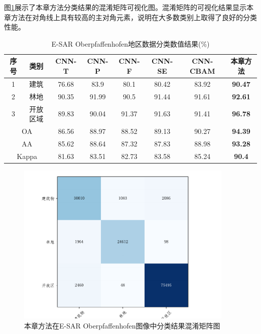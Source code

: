 图\ref{fig:ober_conf_matrix}展示了本章方法分类结果的混淆矩阵可视化图。混淆矩阵的可视化结果显示本章方法在对角线上具有较高的主对角元素，说明在大多数类别上取得了良好的分类性能。

\begin{table}[ht!]
    \caption{E-SAR Oberpfaffenhofen地区数据分类数值结果(\%)}
    \label{tab:ober_res}
    \begin{tabular}{cccccccc}
        \toprule[1.5bp]
        序号                        & 类别    & CNN-T & CNN-P & CNN-F & CNN-SE & CNN-CBAM       & 本章方法           \\
        \midrule[0.75bp]
        1                         & 建筑    & 76.68 & 83.9  & 80.1  & 80.42  & 83.92          & \textbf{90.47} \\
        2                         & 林地    & 90.35 & 91.99 & 90.5  & 91.44  & 91.61          & \textbf{92.61} \\
        3                         & 开放区域  & 89.83 & 90.04 & 91.37 & 91.63  & 91.41          & \textbf{96.78} \\
        \midrule[0.75bp]
        \multicolumn{2}{c}{OA}    & 86.56 & 88.97 & 88.52 & 89.13 & 90.27  & \textbf{94.39}                  \\
        \multicolumn{2}{c}{AA}    & 85.62 & 88.64 & 87.32 & 87.83 & 88.98  & \textbf{93.28}                  \\
        \multicolumn{2}{c}{Kappa} & 81.63 & 83.51 & 82.73 & 83.58 & 85.24  & \textbf{90.4}                   \\
        \bottomrule[1.5bp]
    \end{tabular}
\end{table}

\begin{figure}[ht!]
    \centering
    \includegraphics[width=10.4cm]{pic/chapter3/ober/conf-matrix.pdf}
    \caption{本章方法在E-SAR Oberpfaffenhofen图像中分类结果混淆矩阵图}
    \label{fig:ober_conf_matrix}
\end{figure}



